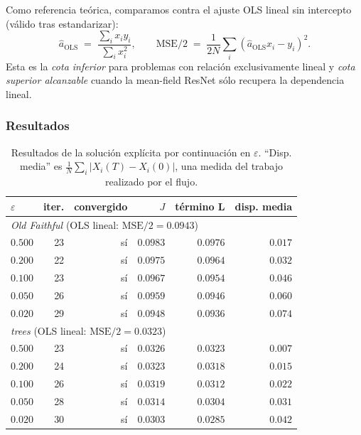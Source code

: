 \documentclass[11pt, a4paper]{article}
\theoremstyle{definition}
\newcommand{\abs}[1]{\left|#1\right|}
\newcommand{\eps}{\varepsilon}
\begin{document}
Como referencia teórica, comparamos contra el ajuste OLS lineal sin
intercepto (válido tras estandarizar):
\begin{equation}
  \hat{a}_{\mathrm{OLS}}
  \;=\;
  \frac{\sum_i x_i y_i}{\sum_i x_i^2},
  \qquad
  \mathrm{MSE}/2 \;=\;
  \frac{1}{2N} \sum_i (\hat{a}_{\mathrm{OLS}} x_i - y_i)^2.
\end{equation}
Esta es la \emph{cota inferior} para problemas con relación
exclusivamente lineal y \emph{cota superior alcanzable} cuando la
mean-field ResNet sólo recupera la dependencia lineal.

\subsubsection{Resultados}

\begin{table}[H]
\centering
\begin{tabular}{lrrrrr}
\toprule
$\eps$ & iter. & convergido & $J$ & término L & disp. media \\
\midrule
\multicolumn{6}{l}{\textit{Old Faithful} (OLS lineal: $\mathrm{MSE}/2 = 0.0943$)} \\
\midrule
$0.500$ & 23 & sí & $0.0983$ & $0.0976$ & $0.017$ \\
$0.200$ & 22 & sí & $0.0975$ & $0.0964$ & $0.032$ \\
$0.100$ & 23 & sí & $0.0967$ & $0.0954$ & $0.046$ \\
$0.050$ & 26 & sí & $0.0959$ & $0.0946$ & $0.060$ \\
$0.020$ & 29 & sí & $0.0948$ & $\mathbf{0.0936}$ & $0.074$ \\
\midrule
\multicolumn{6}{l}{\textit{trees} (OLS lineal: $\mathrm{MSE}/2 = 0.0323$)} \\
\midrule
$0.500$ & 23 & sí & $0.0326$ & $0.0323$ & $0.007$ \\
$0.200$ & 24 & sí & $0.0323$ & $0.0318$ & $0.015$ \\
$0.100$ & 26 & sí & $0.0319$ & $0.0312$ & $0.022$ \\
$0.050$ & 28 & sí & $0.0314$ & $0.0304$ & $0.031$ \\
$0.020$ & 30 & sí & $0.0303$ & $\mathbf{0.0285}$ & $0.042$ \\
\bottomrule
\end{tabular}
\caption{Resultados de la solución explícita por continuación en
$\eps$. ``Disp. media'' es $\frac{1}{N}\sum_i \abs{X_i(T) - X_i(0)}$,
una medida del trabajo realizado por el flujo.}
\label{tab:resultados}
\end{table}
\end{document}
